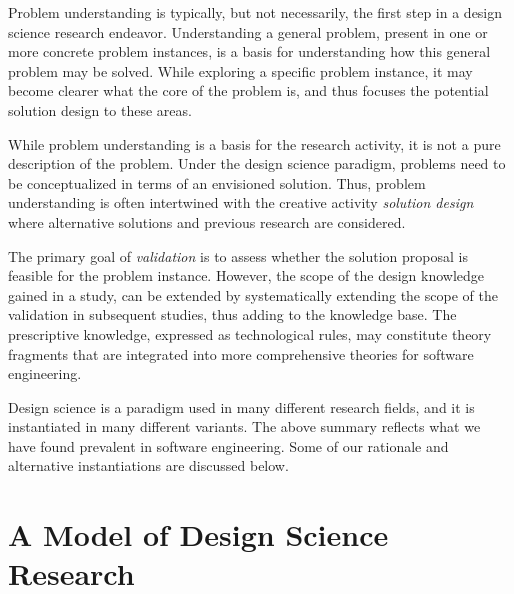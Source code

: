 \documentclass[graybox]{svmult}
\newcommand{\emelie}[1]{\textcolor{red}{{\it [Emelie says: #1]}}}
\newcommand{\emelie}[1]{}
\begin{document}
Problem understanding is typically, but not necessarily, the first step in a design science research endeavor. Understanding a general problem, present in one or more concrete problem instances, is a basis for understanding how this general problem may be solved.  While exploring a specific problem instance,  it may become clearer what the core of the problem is, and thus focuses the potential solution design to these areas. 

While problem understanding is a basis for the research activity, it is not a pure description of the problem. Under the design science paradigm, problems need to be conceptualized in terms of an envisioned solution. Thus, problem understanding is often intertwined with the creative activity \emph{solution design} where alternative solutions and previous research are considered. %


 The primary goal of \emph{validation} is to assess whether the solution proposal is feasible for the problem instance. However, the scope of the design knowledge gained in a study, can be extended by systematically extending the scope of the validation in subsequent studies, thus adding to the knowledge base. The prescriptive knowledge, expressed as technological rules, may constitute theory fragments that are integrated into more comprehensive theories for software engineering. 


Design science is a paradigm used in many different research fields, and it is instantiated in many different variants.  The above summary reflects what we have found prevalent in software engineering. Some of our rationale and alternative instantiations are discussed below.



\section{A Model of Design Science Research}
\label{sec:DesignScienceResearch}
\end{document}
